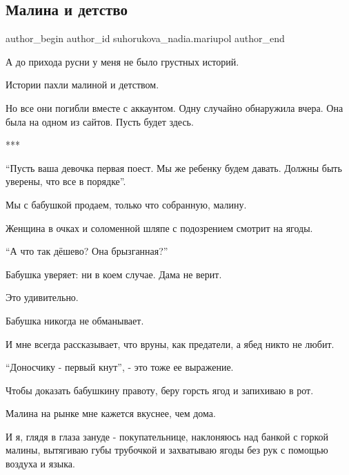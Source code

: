 
 
 
 
 
 
\subsection{Малина и детство}
\label{sec:26_02_2023.tg.suhorukova_nadia.mariupol.1.malina_i_detstvo}
 
\ifcmt
 author_begin
   author_id suhorukova_nadia.mariupol
 author_end
\fi

А до прихода русни у меня не было грустных историй. 

Истории пахли малиной и детством. 

Но все они  погибли вместе с аккаунтом. Одну случайно обнаружила вчера. Она
была на одном из сайтов. Пусть будет здесь. 

***

\enquote{Пусть ваша девочка первая поест. Мы же ребенку будем давать. Должны
быть уверены, что все в порядке}.

Мы с бабушкой продаем, только что собранную, малину.

Женщина в очках и соломенной  шляпе с подозрением смотрит на ягоды. 

\enquote{А что так дёшево? Она брызганная?}

Бабушка уверяет:  ни в коем случае. Дама не верит.

Это  удивительно. 

Бабушка никогда не обманывает. 

И мне всегда рассказывает, что вруны, как  предатели, а ябед никто не любит.

\enquote{Доносчику - первый кнут}, -  это тоже ее выражение.   

Чтобы доказать бабушкину правоту, беру горсть ягод и запихиваю в рот. 

Малина на рынке мне кажется  вкуснее, чем дома. 

И я, глядя в глаза зануде - покупательнице, наклоняюсь над банкой с горкой
малины, вытягиваю губы трубочкой  и захватываю ягоды без рук с помощью  воздуха
и языка. 


